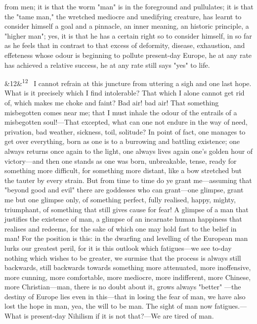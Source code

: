 \documentclass[12pt]{article}
\newcommand{\para}[1][]{\par\noindent\ifx&#1&\else\textsuperscript{\footnotesize #1}~\fi}
\begin{document}
from men; it is that the worm "man" is in the foreground and pullulates; it is that the "tame man," the wretched mediocre and unedifying creature, has learnt to consider himself a goal and a pinnacle, an inner meaning, an historic principle, a "higher man"; yes, it is that he has a certain right so to consider himself, in so far as he feels that in contrast to that excess of deformity, disease, exhaustion, and effeteness whose odour is beginning to pollute present-day Europe, he at any rate has achieved a relative success, he at any rate still says "yes" to life.

\para[12] I cannot refrain at this juncture from uttering a sigh and one last hope. What is it precisely which I find intolerable? That which I alone cannot get rid of, which makes me choke and faint? Bad air! bad air! That something misbegotten comes near me; that I must inhale the odour of the entrails of a misbegotten soul!---That excepted, what can one not endure in the way of need, privation, bad weather, sickness, toil, solitude? In point of fact, one manages to get over everything, born as one is to a burrowing and battling existence; one always returns once again to the light, one always lives again one's golden hour of victory---and then one stands as one was born, unbreakable, tense, ready for something more difficult, for something more distant, like a bow stretched but the tauter by every strain. But from time to time do ye grant me---assuming that "beyond good and evil" there are goddesses who can grant---one glimpse, grant me but one glimpse only, of something perfect, fully realised, happy, mighty, triumphant, of something that still gives cause for fear! A glimpse of a man that justifies the existence of man, a glimpse of an incarnate human happiness that realises and redeems, for the sake of which one may hold fast to the belief in man! For the position is this: in the dwarfing and levelling of the European man lurks our greatest peril, for it is this outlook which fatigues---we see to-day nothing which wishes to be greater, we surmise that the process is always still backwards, still backwards towards something more attenuated, more inoffensive, more cunning, more comfortable, more mediocre, more indifferent, more Chinese, more Christian---man, there is no doubt about it, grows always "better" ---the destiny of Europe lies even in this---that in losing the fear of man, we have also lost the hope in man, yea, the will to be man. The sight of man now fatigues.---What is present-day Nihilism if it is not that?---We are tired of man.
\end{document}
